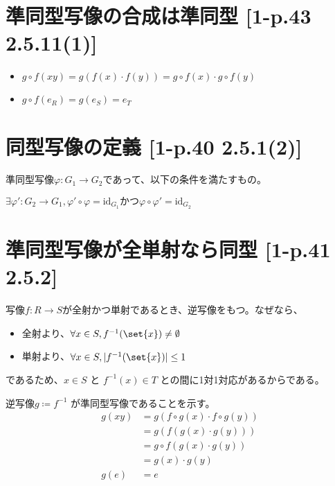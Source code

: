 \documentclass[twocolumn]{jsarticle}
\newcommand{\id}{\text{id}}
\newcommand{\inv}[1]{#1^{-1}}
\renewcommand{\phi}{\varphi}
\begin{document}
\section{準同型写像の合成は準同型 [1-p.43 2.5.11(1)]}
\begin{itemize}
    \item \(g\circ f(xy)=g(f(x)\cdot f(y))=g\circ f(x)\cdot g\circ f(y)\)
    \item \(g\circ f(e_R)=g(e_S)=e_T\)
\end{itemize}

\section{同型写像の定義 [1-p.40 2.5.1(2)]}
準同型写像\(\phi\colon G_1 \to G_2\)であって、以下の条件を満たすもの。

\(\exists \phi'\colon G_2 \to G_1, \phi'\circ\phi=\id_{G_1} かつ \phi\circ\phi'=\id_{G_2}\)
\section{準同型写像が全単射なら同型 [1-p.41 2.5.2]}
写像\(f\colon R\to S\)が全射かつ単射であるとき、逆写像をもつ。なぜなら、
\begin{itemize}
    \item 全射より、\(\forall x\in S, \inv{f}(\set{x}) \neq \emptyset\)
    \item 単射より、\(\forall x\in S, |\inv{f}(\set{x})| \leq 1\)
\end{itemize}
であるため、\(x\in S\) と \(\inv{f}(x) \in T\) との間に1対1対応があるからである。

逆写像\(g\coloneqq \inv{f}\) が準同型写像であることを示す。
\begin{align*}
g(xy)
&=g(f\circ g(x) \cdot f\circ g(y)) \\
&=g(f(g(x) \cdot g(y))) \\
&=g\circ f(g(x) \cdot g(y)) \\
&=g(x) \cdot g(y) \\
g(e)&=e
\end{align*}
\end{document}
